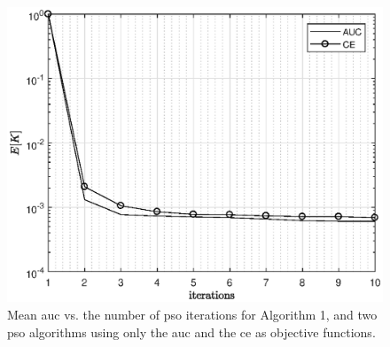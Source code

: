 \documentclass[conference,final]{IEEEtran}
\begin{document}

 
\begin{figure} 
    \centering
    \includegraphics[width=0.9\columnwidth]{newPSO.eps}
    \caption{Mean \ac{auc} vs. the number of \ac{pso} iterations for Algorithm 1, and two \ac{pso} algorithms using only the  \ac{auc} and the \ac{ce} as objective functions. }
    \label{fig:CEvsAUC}
\end{figure}
\end{document}
